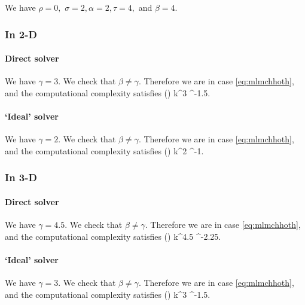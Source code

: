 We have $\rho=0,$ $\sigma = 2, \alpha = 2, \tau = 4,$ and $\beta = 4$.

\subsubsection{In 2-D}

\paragraph{Direct solver}

We have $\gamma = 3$. We check that  $\beta \neq \gamma.$ Therefore we are in case \eqref{eq:mlmchhoth}, and the computational complexity satisfies
\beqs
\CMLhL(\eps) \lesssim k^3 \eps^{-1.5}.
\eeqs

\paragraph{`Ideal' solver}

We have $\gamma = 2$. We check that  $\beta \neq \gamma.$ Therefore we are in case \eqref{eq:mlmchhoth}, and the computational complexity satisfies
\beqs
\CMLhL(\eps) \lesssim k^2 \eps^{-1}.
\eeqs

\subsubsection{In 3-D}

\paragraph{Direct solver}

We have $\gamma = 4.5$. We check that  $\beta \neq \gamma.$ Therefore we are in case \eqref{eq:mlmchhoth}, and the computational complexity satisfies
\beqs
\CMLhL(\eps) \lesssim k^{4.5} \eps^{-2.25}.
\eeqs

\paragraph{`Ideal' solver}

We have $\gamma = 3$. We check that  $\beta \neq \gamma.$ Therefore we are in case \eqref{eq:mlmchhoth}, and the computational complexity satisfies
\beqs
\CMLhL(\eps) \lesssim k^3 \eps^{-1.5}.
\eeqs